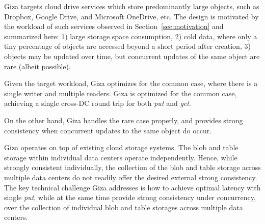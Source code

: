 Giza targets cloud drive services which store predominantly large objects, such as
Dropbox, Google Drive, and Microsoft OneDrive, etc.
The design is motivated by the workload of such services observed in Section~\ref{sec:motivation}
and summarized here:
1) large storage space consumption,
2) cold data, where only a tiny percentage of objects are accessed
beyond a short period after creation,
3) objects may be updated over time, but concurrent updates of the same
object are rare (albeit possible).

Given the target workload, Giza optimizes for the common case, where there is
a single writer and multiple readers. Giza is optimized for the common case, achieving a single cross-DC round trip for both {\em put} and {\em get}.

On the other hand, Giza handles the rare case properly,
and provides strong consistency when concurrent updates to the same object do occur.

Giza operates on top of existing cloud storage systems. 
The blob and table storage within individual data centers operate independently.
Hence, while strongly consistent individually, the collection of the blob and
table storage across multiple data centers do not readily offer the desired
external strong consistency. The key technical challenge Giza addresses is how to achieve
optimal latency with single {\em put}, while at the same time provide
strong consistency under concurrency, over the collection of individual blob and
table storages across multiple data centers.

